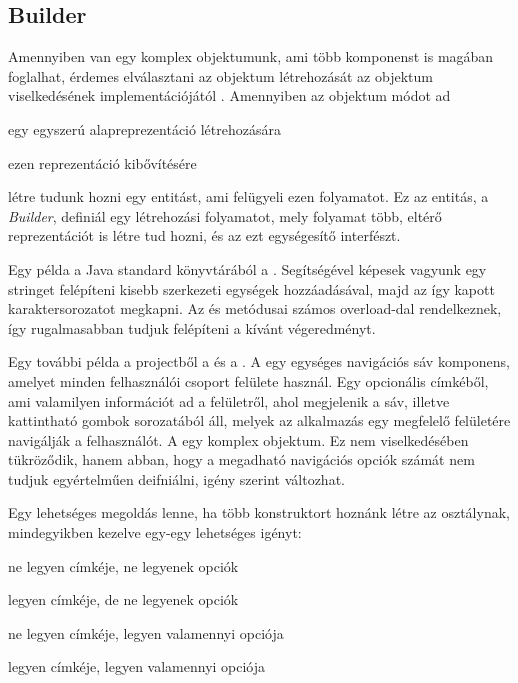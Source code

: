 \subsection{Builder}

Amennyiben van egy komplex objektumunk, ami több komponenst is magában foglalhat, érdemes elválasztani az objektum létrehozását az objektum viselkedésének implementációjától \cite{gamma1995elements} . Amennyiben az objektum módot ad 

\begin{listing}
	\item egy egyszerú alapreprezentáció létrehozására
	\item ezen reprezentáció kibővítésére
\end{listing}

létre tudunk hozni egy entitást, ami felügyeli ezen folyamatot. Ez az entitás, a \emph{Builder}, definiál egy létrehozási folyamatot, mely folyamat több, eltérő reprezentációt is létre tud hozni, és az ezt egységesítő interfészt. \par

Egy példa a Java standard könyvtárából a . Segítségével képesek vagyunk egy stringet felépíteni kisebb szerkezeti egységek hozzáadásával, majd az így kapott karaktersorozatot megkapni. Az  és  metódusai számos overload-dal rendelkeznek, így rugalmasabban tudjuk felépíteni a kívánt végeredményt. \par

Egy további példa a projectből a  és a . A  egy egységes navigációs sáv komponens, amelyet minden felhasználói csoport felülete használ. Egy opcionális címkéből, ami valamilyen információt ad a felületről, ahol megjelenik a sáv, illetve kattintható gombok sorozatából áll, melyek az alkalmazás egy megfelelő felületére navigálják a felhasználót. A  egy komplex objektum. Ez nem viselkedésében tükröződik, hanem abban, hogy a megadható navigációs opciók számát nem tudjuk egyértelműen deifniálni, igény szerint változhat.\par

Egy lehetséges megoldás lenne, ha több konstruktort hoznánk létre az osztálynak, mindegyikben kezelve egy-egy lehetséges igényt: \par

\begin{listing}
	\item ne legyen címkéje, ne legyenek opciók
	\item legyen címkéje, de ne legyenek opciók
	\item ne legyen címkéje, legyen valamennyi opciója
	\item legyen címkéje, legyen valamennyi opciója
\end{listing} \par

